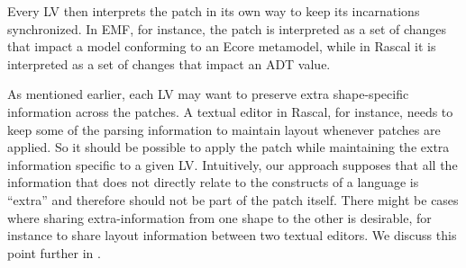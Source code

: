 
Every LV then interprets the patch in its own way to keep its incarnations synchronized.
In EMF, for instance, the patch is interpreted as a set of changes that impact a model conforming to an Ecore metamodel, while in Rascal it is interpreted as a set of changes that impact an ADT value.

As mentioned earlier, each LV may want to preserve extra shape-specific information across the patches.
A textual editor in Rascal, for instance, needs to keep some of the parsing information to maintain layout whenever patches are applied.
So it should be possible to apply the patch while maintaining the extra information specific to a given LV.
Intuitively, our approach supposes that all the information that does not directly relate to the constructs of a language is ``extra'' and therefore should not be part of the patch itself.
There might be cases where sharing extra-information from one shape to the other is desirable, for instance to share layout information between two textual editors.
We discuss this point further in .

